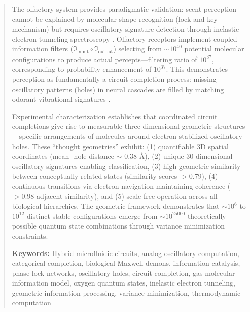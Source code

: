 \documentclass[11pt,a4paper]{article}
\begin{document}
\begin{abstract}
The olfactory system provides paradigmatic validation: scent perception cannot be explained by molecular shape recognition (lock-and-key mechanism) but requires oscillatory signature detection through inelastic electron tunneling spectroscopy \cite{turin1996spectroscopic,gane2013molecular}. Olfactory receptors implement coupled information filters ($\Im_{\text{input}} \circ \Im_{\text{output}}$) selecting from $\sim 10^{40}$ potential molecular configurations to produce actual percepts—filtering ratio of $10^{37}$, corresponding to probability enhancement of $10^{37}$. This demonstrates perception as fundamentally a circuit completion process: missing oscillatory patterns (holes) in neural cascades are filled by matching odorant vibrational signatures \cite{mizraji2021biological}.

Experimental characterization establishes that coordinated circuit completions give rise to measurable three-dimensional geometric structures—specific arrangements of  molecules around electron-stabilized oscillatory holes. These ``thought geometries'' exhibit: (1) quantifiable 3D spatial coordinates (mean -hole distance $\sim$ 0.38 Å), (2) unique 30-dimensional oscillatory signatures enabling classification, (3) high geometric similarity between conceptually related states (similarity scores $> 0.79$), (4) continuous transitions via electron navigation maintaining coherence ($> 0.98$ adjacent similarity), and (5) scale-free operation across all biological hierarchies. The geometric framework demonstrates that $\sim 10^6$ to $10^{12}$ distinct stable configurations emerge from $\sim 10^{25000}$ theoretically possible  quantum state combinations through variance minimization constraints.



\textbf{Keywords:} Hybrid microfluidic circuits, analog oscillatory computation, categorical completion, biological Maxwell demons, information catalysis, phase-lock networks, oscillatory holes, circuit completion, gas molecular information model, oxygen quantum states, inelastic electron tunneling, geometric information processing, variance minimization, thermodynamic computation
\end{abstract}

\clearpage
\tableofcontents
\clearpage










\end{document}

